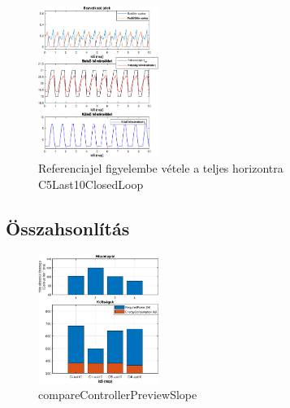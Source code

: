\begin{figure}[H]
	\centering
	\includegraphics[width=0.35\textwidth, trim=0 0 0 0, clip,]{figures/onlab/Slope/C5Last10ClosedLoop}
	\caption{Referenciajel figyelembe vétele a teljes horizontra C5Last10ClosedLoop}
	\label{fig:onlab-refslprev5}
\end{figure}

\subsection{Összahsonlítás}
\begin{figure}[H]
	\centering
	\includegraphics[width=0.35\textwidth, trim=0 0 0 0, clip,]{figures/onlab/Slope/compareControllerPreviewSlope}
	\caption{compareControllerPreviewSlope}
	\label{fig:onlab-refSlprevComp}
\end{figure}


\pagebreak






